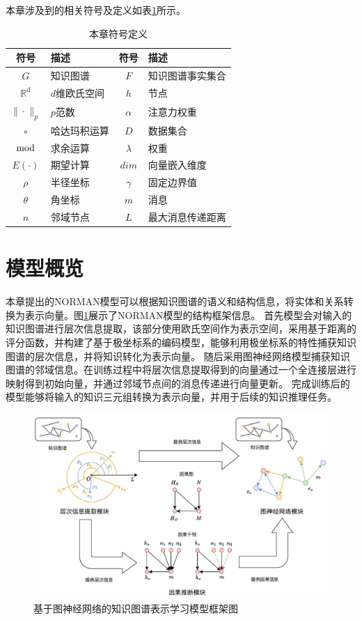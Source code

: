 \documentclass[algorithmlist, AutoFakeBold, AutoFakeSlant, figurelist, tablelist, nomlist, engineering]{seuthesix}
\begin{document}
本章涉及到的相关符号及定义如表\ref{2_symbols}所示。
\begin{table}[ht]
  \centering
  \caption{本章符号定义}
  \begin{tabular*}{0.8\textwidth}{@{\extracolsep{\fill}}clcl}
		\toprule[1pt]
    符号 & 描述 & 符号 & 描述 \\ \hline
    $G$ & 知识图谱 & $F$ & 知识图谱事实集合\\
    $\mathbb{R}^{\mathrm{d}}$ & $d$维欧氏空间 & $h$ & 节点\\
    $\|\cdot\|_{p}$ & $p$范数 & $\alpha$ & 注意力权重\\
    $\circ$ & 哈达玛积运算 & $D$ & 数据集合\\
    $\bmod$ & 求余运算 & $\lambda$ & 权重\\ 
    $E(\cdot)$ & 期望计算 & $dim$ & 向量嵌入维度\\
    $\rho$ & 半径坐标 & $\gamma$ & 固定边界值\\
    $\theta$ & 角坐标 & $m$ & 消息\\
    $n$ & 邻域节点 & $L$ & 最大消息传递距离\\
		\bottomrule[1pt]
	\end{tabular*}
  \label{2_symbols}
\end{table}

\section{模型概览}
本章提出的NORMAN模型可以根据知识图谱的语义和结构信息，将实体和关系转换为表示向量。图\ref{2_NORMAN}展示了NORMAN模型的结构框架信息。
首先模型会对输入的知识图谱进行层次信息提取，该部分使用欧氏空间作为表示空间，采用基于距离的评分函数，并构建了基于极坐标系的编码模型，能够利用极坐标系的特性捕获知识图谱的层次信息，并将知识转化为表示向量。
随后采用图神经网络模型捕获知识图谱的邻域信息。在训练过程中将层次信息提取得到的向量通过一个全连接层进行映射得到初始向量，并通过邻域节点间的消息传递进行向量更新。
完成训练后的模型能够将输入的知识三元组转换为表示向量，并用于后续的知识推理任务。
\begin{figure}[H]
  \centering
  \includegraphics[width=1.0\textwidth]{2_NORMAN}
  \caption{基于图神经网络的知识图谱表示学习模型框架图}
  \label{2_NORMAN}
\end{figure}
\end{document}
